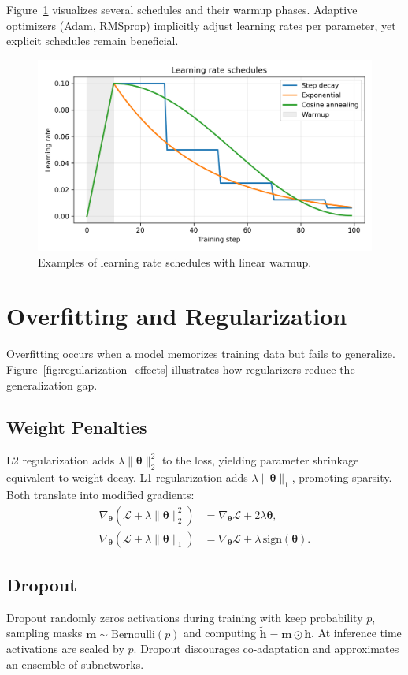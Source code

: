 ﻿\documentclass[12pt]{article}
\begin{document}
Figure~\ref{fig:lr_schedules} visualizes several schedules and their warmup phases. Adaptive optimizers (Adam, RMSprop) implicitly adjust learning rates per parameter, yet explicit schedules remain beneficial.

\begin{figure}[H]
  \centering
  \includegraphics[width=0.8\linewidth]{learning_rate_schedules.png}
  \caption{Examples of learning rate schedules with linear warmup.}
  \label{fig:lr_schedules}
\end{figure}
\FloatBarrier

\section{Overfitting and Regularization}
Overfitting occurs when a model memorizes training data but fails to generalize. Figure~\ref{fig:regularization_effects} illustrates how regularizers reduce the generalization gap.

\subsection{Weight Penalties}
L2 regularization adds $\lambda \|\boldsymbol{\theta}\|_2^2$ to the loss, yielding parameter shrinkage equivalent to weight decay. L1 regularization adds $\lambda \|\boldsymbol{\theta}\|_1$, promoting sparsity. Both translate into modified gradients:
\begin{align}
  \nabla_{\boldsymbol{\theta}} (\mathcal{L} + \lambda \|\boldsymbol{\theta}\|_2^2) &= \nabla_{\boldsymbol{\theta}} \mathcal{L} + 2\lambda \boldsymbol{\theta}, \\
  \nabla_{\boldsymbol{\theta}} (\mathcal{L} + \lambda \|\boldsymbol{\theta}\|_1) &= \nabla_{\boldsymbol{\theta}} \mathcal{L} + \lambda\, \mathrm{sign}(\boldsymbol{\theta}).
\end{align}

\subsection{Dropout}
Dropout randomly zeros activations during training with keep probability $p$, sampling masks $\mathbf{m} \sim \mathrm{Bernoulli}(p)$ and computing $\tilde{\mathbf{h}} = \mathbf{m} \odot \mathbf{h}$. At inference time activations are scaled by $p$. Dropout discourages co-adaptation and approximates an ensemble of subnetworks.
\end{document}
